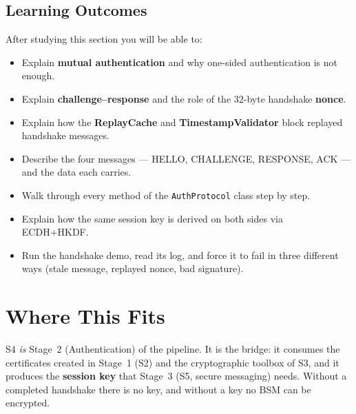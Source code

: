 \documentclass[11pt,a4paper]{report}
\begin{document}
\subsection*{Learning Outcomes}
After studying this section you will be able to:
\begin{itemize}
  \item Explain \textbf{mutual authentication} and why one-sided authentication
        is not enough.
  \item Explain \textbf{challenge--response} and the role of the 32-byte
        handshake \textbf{nonce}.
  \item Explain how the \textbf{ReplayCache} and \textbf{TimestampValidator}
        block replayed handshake messages.
  \item Describe the four messages --- HELLO, CHALLENGE, RESPONSE, ACK --- and
        the data each carries.
  \item Walk through every method of the \texttt{AuthProtocol} class step by step.
  \item Explain how the same session key is derived on both sides via ECDH+HKDF.
  \item Run the handshake demo, read its log, and force it to fail in three
        different ways (stale message, replayed nonce, bad signature).
\end{itemize}

\section{Where This Fits}

S4 \emph{is} Stage~2 (Authentication) of the pipeline. It is the bridge: it
consumes the certificates created in Stage~1 (S2) and the cryptographic toolbox
of S3, and it produces the \textbf{session key} that Stage~3 (S5, secure
messaging) needs. Without a completed handshake there is no key, and without a
key no BSM can be encrypted.
\end{document}
